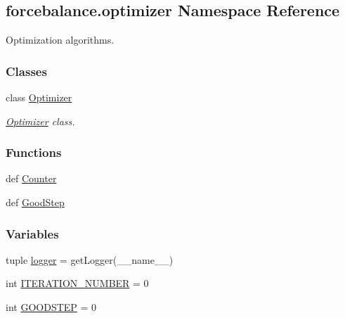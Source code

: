 \hypertarget{namespaceforcebalance_1_1optimizer}{\subsection{forcebalance.\-optimizer Namespace Reference}
\label{namespaceforcebalance_1_1optimizer}
}


Optimization algorithms.  


\subsubsection*{Classes}
\begin{DoxyCompactItemize}
\item 
class \hyperlink{classforcebalance_1_1optimizer_1_1Optimizer}{Optimizer}
\begin{DoxyCompactList}\small\item\em \hyperlink{classforcebalance_1_1optimizer_1_1Optimizer}{Optimizer} class. \end{DoxyCompactList}\end{DoxyCompactItemize}
\subsubsection*{Functions}
\begin{DoxyCompactItemize}
\item 
def \hyperlink{namespaceforcebalance_1_1optimizer_ae1f6c649703a22b2f767a5f6bf53297b}{Counter}
\item 
def \hyperlink{namespaceforcebalance_1_1optimizer_ab43948ecf30c90d319e0c0b107fe484a}{Good\-Step}
\end{DoxyCompactItemize}
\subsubsection*{Variables}
\begin{DoxyCompactItemize}
\item 
tuple \hyperlink{namespaceforcebalance_1_1optimizer_a8c7d22696df2debf02ce9e3bb35349fd}{logger} = get\-Logger(\-\_\-\-\_\-name\-\_\-\-\_\-)
\item 
int \hyperlink{namespaceforcebalance_1_1optimizer_ac3e728fa9f2dacdcca7e1b51d9f2a49e}{I\-T\-E\-R\-A\-T\-I\-O\-N\-\_\-\-N\-U\-M\-B\-E\-R} = 0
\item 
int \hyperlink{namespaceforcebalance_1_1optimizer_a7b0cf561a0ec911ee4b217cb0b05a28e}{G\-O\-O\-D\-S\-T\-E\-P} = 0
\end{DoxyCompactItemize}



